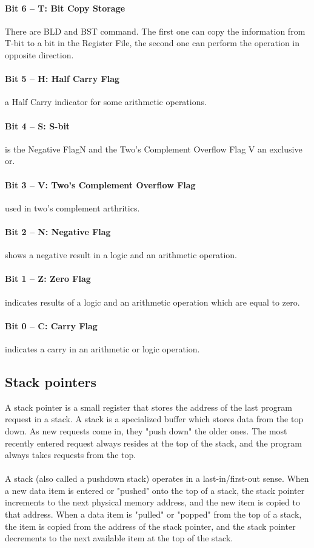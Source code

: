 \documentclass[english]{article}
\begin{document}
\paragraph{Bit 6 – T: Bit Copy Storage} There are BLD and BST command. The first one can copy the information from T-bit to a bit in the Register File, the second one can perform the operation in opposite direction.
\paragraph{Bit 5 – H: Half Carry Flag}  a Half Carry indicator for some arithmetic operations.
\paragraph{Bit 4 – S: S-bit} is the Negative FlagN and the Two’s Complement Overflow Flag V an exclusive or. 
\paragraph{Bit 3 – V: Two’s Complement Overflow Flag}  used in two’s complement arthritics. 
\paragraph{Bit 2 – N: Negative Flag} shows a negative result in a logic and an arithmetic operation. 
\paragraph{Bit 1 – Z: Zero Flag}  indicates results of a logic and an arithmetic operation which are equal to zero.
\paragraph{ Bit 0 – C: Carry Flag} indicates a carry in an arithmetic or logic operation. 
\subsection{Stack pointers}
A stack pointer is a small register that stores the address of the last program request in a stack. A stack is a specialized buffer which stores data from the top down. As new requests come in, they "push down" the older ones. The most recently entered request always resides at the top of the stack, and the program always takes requests from the top.\\\\
A stack (also called a pushdown stack) operates in a last-in/first-out sense. When a new data item is entered or "pushed" onto the top of a stack, the stack pointer increments to the next physical memory address, and the new item is copied to that address. When a data item is "pulled" or "popped" from the top of a stack, the item is copied from the address of the stack pointer, and the stack pointer decrements to the next available item at the top of the stack.
\end{document}
